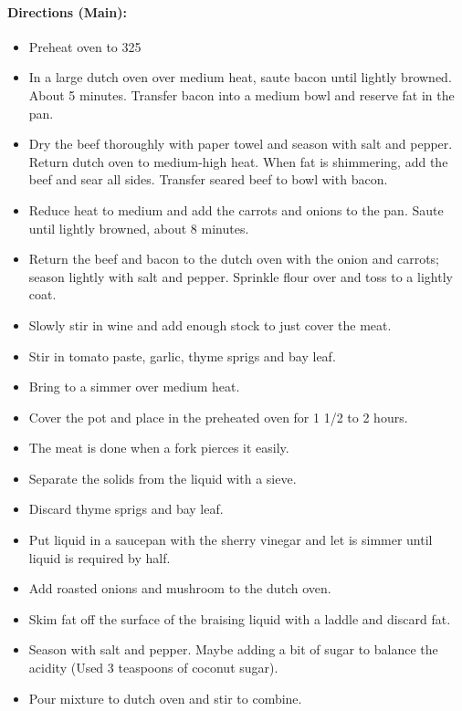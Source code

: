 \documentclass{article}
\begin{document}
\paragraph{Directions (Main):}
\begin{itemize}
    \item Preheat oven to 325
    \item In a large dutch oven over medium heat, saute bacon until lightly browned. About 5 minutes. Transfer bacon into a medium bowl and reserve fat in the pan.
    \item Dry the beef thoroughly with paper towel and season with salt and pepper. Return dutch oven to medium-high heat. When fat is shimmering, add the beef and sear all sides. Transfer seared beef to bowl with bacon.
    \item Reduce heat to medium and add the carrots and onions to the pan. Saute until lightly browned, about 8 minutes.
    \item Return the beef and bacon to the dutch oven with the onion and carrots; season lightly with salt and pepper. Sprinkle flour over and toss to a lightly coat.
    \item Slowly stir in wine and add enough stock to just cover the meat.
    \item Stir in tomato paste, garlic, thyme sprigs and bay leaf.
    \item Bring to a simmer over medium heat.
    \item Cover the pot and place in the preheated oven for 1 1/2 to 2 hours.
    \item The meat is done when a fork pierces it easily.
    \item Separate the solids from the liquid with a sieve.
    \item Discard thyme sprigs and bay leaf.
    \item Put liquid in a saucepan with the sherry vinegar and let is simmer until liquid is required by half.
    \item Add roasted onions and mushroom to the dutch oven.
    \item Skim fat off the surface of the braising liquid with a laddle and discard fat.
    \item Season with salt and pepper. Maybe adding a bit of sugar to balance the acidity (Used 3 teaspoons of coconut sugar).
    \item Pour mixture to dutch oven and stir to combine.
\end{itemize} 
\end{document}
